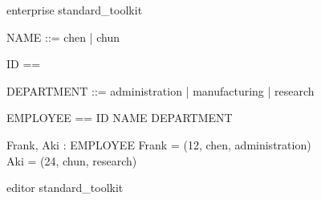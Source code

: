 \documentclass{llncs}
\begin{document}
\begin{zsection}
\SECTION enterprise \parents standard\_toolkit
\end{zsection}

\begin{zed}
NAME ::= chen | chun 
\end{zed}
\begin{zed}
ID == \nat
\end{zed}
\begin{zed}
DEPARTMENT ::= administration | manufacturing | research
\end{zed}
\begin{zed}
EMPLOYEE == ID \cross NAME \cross DEPARTMENT
\end{zed}
\begin{axdef}
  Frank, Aki : EMPLOYEE
\where Frank = (12, chen, administration) \\
  Aki = (24, chun, research)
\end{axdef}

\begin{zsection}
\SECTION editor \parents standard\_toolkit
\end{zsection}
\end{document}
